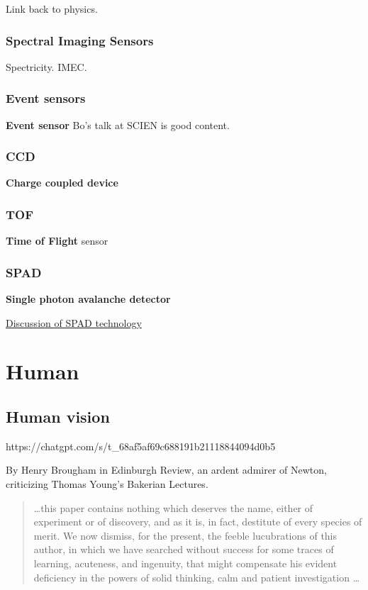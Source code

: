 \documentclass[
  letterpaper,
]{book}
\begin{document}
Link back to physics.

\section{Spectral Imaging Sensors}\label{sec-sensor-spectral}

Spectricity. IMEC.

\section{Event sensors}\label{sec-sensor-event}

\textbf{Event sensor} Bo's talk at SCIEN is good content.

\section{CCD}\label{sec-sensor-ccd}

\textbf{Charge coupled device}

\section{TOF}\label{sec-sensor-tof}

\textbf{Time of Flight} sensor

\section{SPAD}\label{sec-sensor-spad}

\textbf{Single photon avalanche detector}

\href{https://g.co/gemini/share/1618a5d47f5a}{Discussion of SPAD
technology}

\part{Human}

\chapter{Human vision}\label{sec-human}

https://chatgpt.com/s/t\_68af5af69c688191b21118844094d0b5

By Henry Brougham in Edinburgh Review, an ardent admirer of Newton,
criticizing Thomas Young's Bakerian Lectures.

\begin{quote}
\ldots this paper contains nothing which deserves the name, either of
experiment or of discovery, and as it is, in fact, destitute of every
species of merit. We now dismiss, for the present, the feeble
lucubrations of this author, in which we have searched without success
for some traces of learning, acuteness, and ingenuity, that might
compensate his evident deficiency in the powers of solid thinking, calm
and patient investigation \ldots{}
\end{quote}
\end{document}
